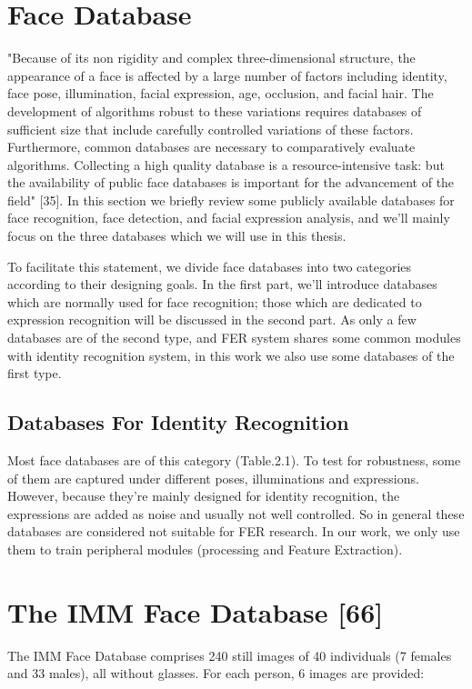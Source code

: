 \documentclass[12pt, twoside]{report}
\begin{document}
	\section{Face Database}
	"Because of its non rigidity and complex three-dimensional structure, the appearance of a face is affected by a large number of factors including identity, face pose, illumination, facial expression, age, occlusion, and facial hair. The development of algorithms robust to these variations requires databases of sufficient size that include carefully controlled variations of these factors. Furthermore, common databases are necessary to comparatively evaluate algorithms. Collecting a high quality database is a resource-intensive task: but the availability of public face databases is important for the advancement of the field" [35]. In this section we briefly review some publicly available databases for face recognition, face detection, and facial expression analysis, and we'll mainly focus on the three databases which we will use in this thesis. 
	\par
	To facilitate this statement, we divide face databases into two categories according to their designing goals. In the first part, we'll introduce databases which are normally used for face recognition; those which are dedicated to expression recognition will be discussed in the second part. As only a few databases are of the second type, and FER system shares some common modules with identity recognition system, in this work we also use some databases of the first type.

	\subsection{Databases For Identity Recognition}
	Most face databases are of this category (Table.2.1). To test for robustness, some of them are captured under different poses, illuminations and expressions. However, because they're mainly designed for identity recognition, the expressions are added as noise and usually not well controlled. So in general these databases are considered not suitable for FER research. In our work, we only use them to train peripheral modules (processing and Feature Extraction).

	\section*{The IMM Face Database [66]}
	The IMM Face Database comprises 240 still images of 40 individuals (7 females and 33 males), all without glasses. For each person, 6 images are provided:
\end{document}
